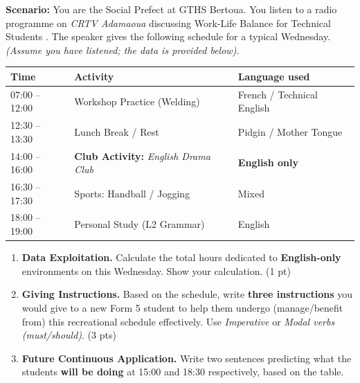 \documentclass[11pt]{article}
\begin{document}
\begin{exercice}
\textbf{Scenario:} You are the Social Prefect at GTHS Bertoua. You listen to a radio programme on \textit{CRTV Adamaoua} discussing \og Work-Life Balance for Technical Students \fg. The speaker gives the following schedule for a typical Wednesday. \textit{(Assume you have listened; the data is provided below).}

\begin{center}
\begin{tabular}{|l|l|l|}
\hline
\textbf{Time} & \textbf{Activity} & \textbf{Language used} \\
\hline
07:00 -- 12:00 & Workshop Practice (Welding) & French / Technical English \\
12:30 -- 13:30 & Lunch Break / Rest & Pidgin / Mother Tongue \\
14:00 -- 16:00 & \textbf{Club Activity:} \textit{English Drama Club} & \textbf{English only} \\
16:30 -- 17:30 & Sports: Handball / Jogging & Mixed \\
18:00 -- 19:00 & Personal Study (L2 Grammar) & English \\
\hline
\end{tabular}
\end{center}

\begin{enumerate}
    \item \textbf{Data Exploitation.} Calculate the total hours dedicated to \textbf{English-only} environments on this Wednesday. Show your calculation. (1 pt)
    \item \textbf{Giving Instructions.} Based on the schedule, write \textbf{three instructions} you would give to a new Form 5 student to help them \og undergo \fg (manage/benefit from) this recreational schedule effectively. Use \textit{Imperative} or \textit{Modal verbs (must/should)}. (3 pts)
    \item \textbf{Future Continuous Application.} Write two sentences predicting what the students \textbf{will be doing} at 15:00 and 18:30 respectively, based on the table.
\end{enumerate}
\end{exercice}
\end{document}
